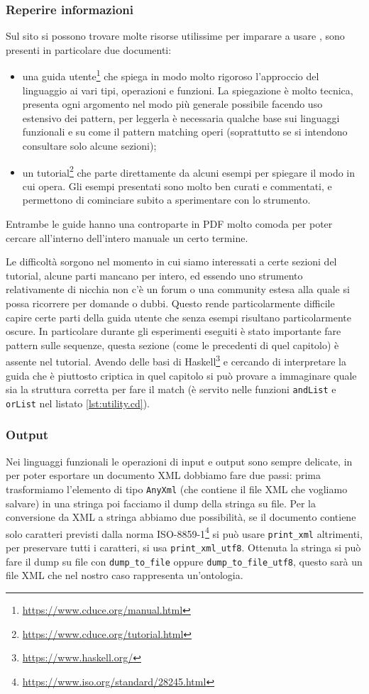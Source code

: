 \subsubsection{Reperire informazioni}
Sul sito si possono trovare molte risorse utilissime per imparare a usare \cduce, sono presenti in particolare due documenti:
\begin{itemize}
	\item una guida utente\footnote{\url{https://www.cduce.org/manual.html}} che spiega in modo molto rigoroso l'approccio del linguaggio ai vari tipi, operazioni e funzioni. La spiegazione è molto tecnica, presenta ogni argomento nel modo più generale possibile facendo uso estensivo dei pattern, per leggerla è necessaria qualche base sui linguaggi funzionali e su come il pattern matching operi (soprattutto se si intendono consultare solo alcune sezioni);
	\item un tutorial\footnote{\url{https://www.cduce.org/tutorial.html}} che parte direttamente da alcuni esempi per spiegare il modo in cui \cduce opera. Gli esempi presentati sono molto ben curati e commentati, e permettono di cominciare subito a sperimentare con lo strumento.
\end{itemize}
Entrambe le guide hanno una controparte in PDF molto comoda per poter cercare all'interno dell'intero manuale un certo termine.

Le difficoltà sorgono nel momento in cui siamo interessati a certe sezioni del tutorial, alcune parti mancano per intero, ed essendo uno strumento relativamente di nicchia non c'è un forum o una community estesa alla quale si possa ricorrere per domande o dubbi. Questo rende particolarmente difficile capire certe parti della guida utente che senza esempi risultano particolarmente oscure. In particolare durante gli esperimenti eseguiti è stato importante fare pattern sulle sequenze, questa sezione (come le precedenti di quel capitolo) è assente nel tutorial. Avendo delle basi di Haskell\footnote{\url{https://www.haskell.org/}} e cercando di interpretare la guida che è piuttosto criptica in quel capitolo si può provare a immaginare quale sia la struttura corretta per fare il match (è servito nelle funzioni \verb|andList| e \verb|orList| nel listato \ref{lst:utility.cd}).
\subsubsection{Output}
Nei linguaggi funzionali le operazioni di input e output sono sempre delicate, in \cduce per poter esportare un documento XML dobbiamo fare due passi: prima trasformiamo l'elemento di tipo \verb|AnyXml| (che contiene il file XML che vogliamo salvare) in una stringa poi facciamo il dump della stringa su file. Per la conversione da XML a stringa abbiamo due possibilità, se il documento contiene solo caratteri previsti dalla norma  ISO-8859-1\footnote{\url{https://www.iso.org/standard/28245.html}} si può usare \verb|print_xml| altrimenti, per preservare tutti i caratteri, si usa \verb|print_xml_utf8|. Ottenuta la stringa si può fare il dump su file con \verb|dump_to_file| oppure \verb|dump_to_file_utf8|, questo sarà un file XML che nel nostro caso rappresenta un'ontologia.

